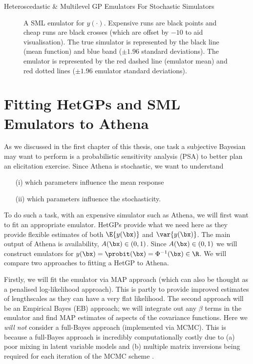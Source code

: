 \begin{chapter}{Heteroscedastic \& Multilevel GP Emulators For Stochastic Simulators\label{Ch:Hetsml}}
\begin{figure}[ht]
	\caption{A SML emulator for $y(\cdot)$. Expensive runs are black points and cheap runs are black crosses (which are offset by $-10$ to aid visualisation). The true simulator is represented by the black line (mean function) and blue band ($\pm 1.96$ standard deviations). The emulator is represented by the red dashed line (emulator mean) and red dotted lines ($\pm 1.96$ emulator standard deviations).\label{Fig:comparison}}
\end{figure}

\section{Fitting HetGPs and SML Emulators to Athena}
As we discussed in the first chapter of this thesis, one task a subjective Bayesian may want to perform is a probabilistic sensitivity analysis (PSA) to better plan an elicitation exercise. Since Athena is stochastic, we want to understand
\begin{itemize}
	\item[(i)] which parameters influence the mean response
	\item[(ii)] which parameters influence the stochasticity.
\end{itemize}
To do such a task, with an expensive simulator such as Athena, we will first want to fit an appropriate emulator. HetGPs provide what we need here as they provide flexible estimates of both $\E\{y(\bx)\}$ and $\var\{y(\bx)\}$. The main output of Athena is availability, $A(\bx) \in (0,1)$. Since $A(\bx) \in (0,1)$ we will construct emulators for $y(\bx) = \probit (\bx) = \Phi^{-1}(\bx) \in \R$.  We will compare two approaches to fitting a HetGP to Athena.

Firstly, we will fit the emulator via MAP approach (which can also be thought as a penalised log-likelihood approach). This is partly to provide improved estimates of lengthscales as they can have a very flat likelihood. The second approach will be an Empirical Bayes (EB) approach; we will integrate out any $\beta$ terms in the emulator and find MAP estimates of aspects of the covariance functions. Here we \textit{will not} consider a full-Bayes approach (implemented via MCMC). This is because a full-Bayes approach is incredibly computationally costly due to (a) poor mixing in latent variable models and (b) multiple matrix inversions being required for each iteration of the MCMC scheme \citep{Kersting2007}.

\end{chapter}
